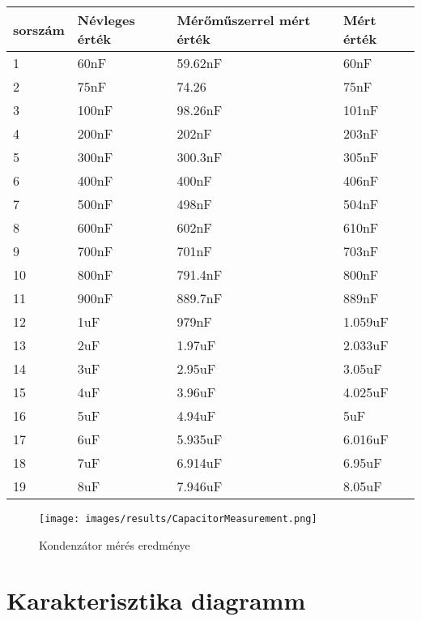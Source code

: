 \begin{table}[h]
    \begin{tabular}{|l|l|l|l|}
    \hline
    sorszám & Névleges érték & Mérőműszerrel mért érték & Mért érték \\ \hline
    1       & 60nF           & 59.62nF                  & 60nF       \\ \hline
    2       & 75nF           & 74.26                    & 75nF       \\ \hline
    3       & 100nF          & 98.26nF                  & 101nF      \\ \hline
    4       & 200nF          & 202nF                    & 203nF      \\ \hline
    5       & 300nF          & 300.3nF                  & 305nF      \\ \hline
    6       & 400nF          & 400nF                    & 406nF      \\ \hline
    7       & 500nF          & 498nF                    & 504nF      \\ \hline
    8       & 600nF          & 602nF                    & 610nF      \\ \hline
    9       & 700nF          & 701nF                    & 703nF      \\ \hline
    10      & 800nF          & 791.4nF                  & 800nF      \\ \hline
    11      & 900nF          & 889.7nF                  & 889nF      \\ \hline
    12      & 1uF            & 979nF                    & 1.059uF    \\ \hline
    13      & 2uF            & 1.97uF                   & 2.033uF    \\ \hline
    14      & 3uF            & 2.95uF                   & 3.05uF     \\ \hline
    15      & 4uF            & 3.96uF                   & 4.025uF    \\ \hline
    16      & 5uF            & 4.94uF                   & 5uF        \\ \hline
    17      & 6uF            & 5.935uF                  & 6.016uF    \\ \hline
    18      & 7uF            & 6.914uF                  & 6.95uF     \\ \hline
    19      & 8uF            & 7.946uF                  & 8.05uF     \\ \hline
    \end{tabular}
    \end{table}

    \begin{figure}[H]
        \centering
        \texttt{[image: images/results/CapacitorMeasurement.png]}
        \caption{Kondenzátor mérés eredménye}
        \label{fig:CapacitorResults}
    \end{figure}

\section{Karakterisztika diagramm}


